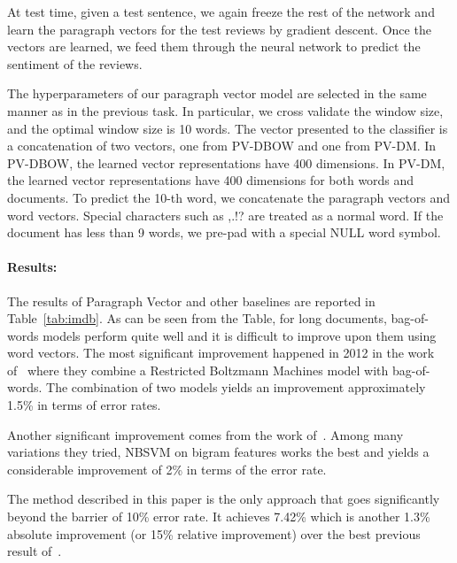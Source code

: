 \documentclass{article}
\begin{document}
At test time, given a test sentence, we again freeze the rest of the
network and learn the paragraph vectors for the test reviews by
gradient descent. Once the vectors are learned, we feed them through
the neural network to predict the sentiment of the reviews.

The hyperparameters of our paragraph vector model are selected in the
same manner as in the previous task. In particular, we cross validate
the window size, and the optimal window size is 10 words. The vector
presented to the classifier is a concatenation of two vectors, one
from PV-DBOW and one from PV-DM. In PV-DBOW, the learned vector
representations have 400 dimensions. In PV-DM, the learned vector
representations have 400 dimensions for both words and documents. To
predict the 10-th word, we concatenate the paragraph vectors and word
vectors. Special characters such as ,.!? are treated as a normal
word. If the document has less than 9 words, we pre-pad with a special
NULL word symbol.

\paragraph{Results:}
The results of Paragraph Vector and other baselines are reported in
Table~\ref{tab:imdb}. As can be seen from the Table, for long
documents, bag-of-words models perform quite well and it is difficult to
improve upon them using word vectors. The most significant improvement
happened in 2012 in the work of~\cite{dahl12} where they combine a
Restricted Boltzmann Machines model with bag-of-words. The combination
of two models yields an improvement approximately 1.5\% in terms of
error rates.

Another significant improvement comes from the work
of~\cite{wang12}. Among many variations they tried, NBSVM on bigram
features works the best and yields a considerable improvement of 2\% in
terms of the error rate.

The method described in this paper is the only
approach that goes significantly beyond the barrier of 10\% error rate.
It achieves
7.42\% which is another 1.3\% absolute improvement (or 15\% relative
improvement) over the best previous result of~\cite{wang12}.
\end{document}
